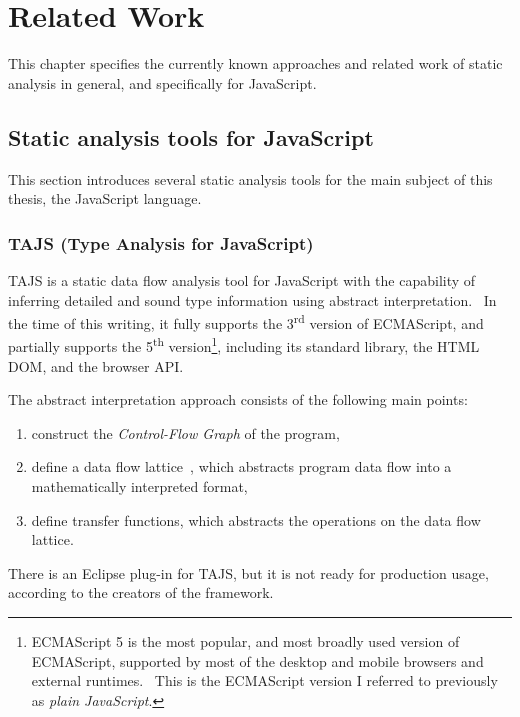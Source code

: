 \chapter{Related Work}

This chapter specifies the currently known approaches and related work of static analysis in general, and specifically for JavaScript.


\section{Static analysis tools for JavaScript}

This section introduces several static analysis tools for the main subject of this thesis, the JavaScript language.


\subsection{TAJS (Type Analysis for JavaScript)}

TAJS is a static data flow analysis tool for JavaScript with the capability of inferring detailed and sound type information using abstract interpretation.~\cite{jensen2009type} In the time of this writing, it fully supports the 3\textsuperscript{rd} version of ECMAScript, and partially supports the 5\textsuperscript{th} version\footnote{ECMAScript 5 is the most popular, and most broadly used version of ECMAScript, supported by most of the desktop and mobile browsers and external runtimes.~\cite{kangax-es5} This is the ECMAScript version I referred to previously as \emph{plain JavaScript}.}, including its standard library, the HTML DOM, and the browser API.~\cite{tajs-github}

The abstract interpretation approach consists of the following main points:~\cite{tajs-presentation}

\begin{enumerate}
\item construct the \emph{Control-Flow Graph} of the program,
\item define a data flow lattice~\cite{jensen2009type}, which abstracts program data flow into a mathematically interpreted format,
\item define transfer functions, which abstracts the operations on the data flow lattice.
\end{enumerate}

There is an Eclipse plug-in for TAJS, but it is not ready for production usage, according to the creators of the framework.~\cite{tajs-website}


